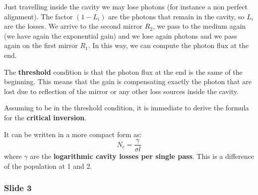 \documentclass[../main/main.tex]{subfiles}
\begin{document}
Just travelling inside the cavity we may lose photons (for instance a non perfect alignment). The factor \( (1-L_i) \) are the photons that remain in the cavity, so \( L_i \) are the losses. We arrive to the second mirror \( R_2 \), we pass to the medium again (we have again the exponential gain) and we lose again photons and we pass again on the first mirror \( R_1 \).
In this way, we can compute the photon flux at the end.

The \textbf{threshold} condition is that the photon flux at the end is the same of the beginning. This means that the gain is compensating exactly the photon that are lost due to reflection of the mirror or any other loss sources inside the cavity.

Assuming to be in the threshold condition, it is immediate to derive the formula for the \textbf{critical inversion}.

It can be written in a more compact form as:
\begin{equation*}
  N_c = \frac{\gamma  }{\sigma l}
\end{equation*}
where \( \gamma   \) are the \textbf{logarithmic cavity losses per single pass}. This is a difference of the population at 1 and 2.

\subsubsection*{Slide 3}
\end{document}
